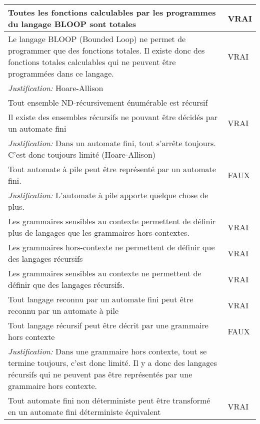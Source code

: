 \begin{tabular}{p{13cm}|l}
    Toutes les fonctions calculables par les programmes du langage BLOOP sont totales & VRAI \\
    \hline
    Le langage BLOOP (Bounded Loop) ne permet de programmer que des fonctions totales. Il existe donc des fonctions totales calculables qui ne peuvent être programmées dans ce langage. & VRAI \\
    \textit{Justification:} Hoare-Allison & \\
     \hline
    Tout ensemble ND-récursivement énumérable est récursif& \\
     \hline
    Il existe des ensembles récursifs ne pouvant être décidés par un automate fini & VRAI \\
    \textit{Justification:} Dans un automate fini, tout s'arrête toujours. C'est donc toujours limité (Hoare-Allison) & \\
     \hline
    Tout automate à pile peut être représenté par un automate fini.& FAUX\\
    \textit{Justification:} L'automate à pile apporte quelque chose de plus. & \\
     \hline
    Les grammaires sensibles au contexte permettent de définir plus de langages que les grammaires hors-contextes.& VRAI\\
     \hline
    Les grammaires hors-contexte ne permettent de définir que des langages récursifs& VRAI\\
     \hline
    Les grammaires sensibles au contexte ne permettent de définir que des langages récursifs. & VRAI \\
     \hline
    Tout langage reconnu par un automate fini peut être reconnu par un automate à pile & VRAI \\
     \hline
    Tout langage récursif peut être décrit par une grammaire hors contexte & FAUX \\
    \textit{Justification:} Dans une grammaire hors contexte, tout se termine toujours, c’est donc limité. Il y a donc des langages récursifs qui ne peuvent pas être représentés par une grammaire hors contexte. & \\
     \hline
    Tout automate fini non déterministe peut être transformé en un automate fini déterministe équivalent & VRAI \\

\end{tabular}
